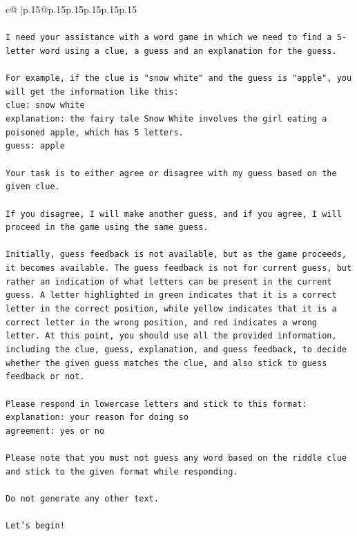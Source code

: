 \documentclass{article}
\begin{document}
{\begin{supertabular}{c@{$\;$}|p{.15\linewidth}@{}p{.15\linewidth}p{.15\linewidth}p{.15\linewidth}p{.15\linewidth}p{.15\linewidth}}
{{{\\ 
\\ 
\texttt{I need your assistance with a word game in which we need to find a 5{-}letter word using a clue, a guess and an explanation for the guess.} \\
\\ 
\texttt{For example, if the clue is "snow white" and the guess is "apple", you will get the information like this:} \\
\texttt{clue: snow white} \\
\texttt{explanation: the fairy tale Snow White involves the girl eating a poisoned apple, which has 5 letters.} \\
\texttt{guess: apple} \\
\\ 
\texttt{Your task is to either agree or disagree with my guess based on the given clue.} \\
\\ 
\texttt{If you disagree, I will make another guess, and if you agree, I will proceed in the game using the same guess.} \\
\\ 
\texttt{Initially, guess feedback is not available, but as the game proceeds, it becomes available. The guess feedback is not for current guess, but rather an indication of what letters can be present in the current guess. A letter highlighted in green indicates that it is a correct letter in the correct position, while yellow indicates that it is a correct letter in the wrong position, and red indicates a wrong letter. At this point, you should use all the provided information, including the clue, guess, explanation, and guess feedback, to decide whether the given guess matches the clue, and also stick to guess feedback or not.} \\
\\ 
\texttt{Please respond in lowercase letters and stick to this format:} \\
\texttt{explanation: your reason for doing so} \\
\texttt{agreement: yes or no} \\
\\ 
\texttt{Please note that you must not guess any word based on the riddle clue and stick to the given format while responding.} \\
\\ 
\texttt{Do not generate any other text.} \\
\\ 
\texttt{Let's begin!} \\
}}}
\end{supertabular}}
\end{document}
